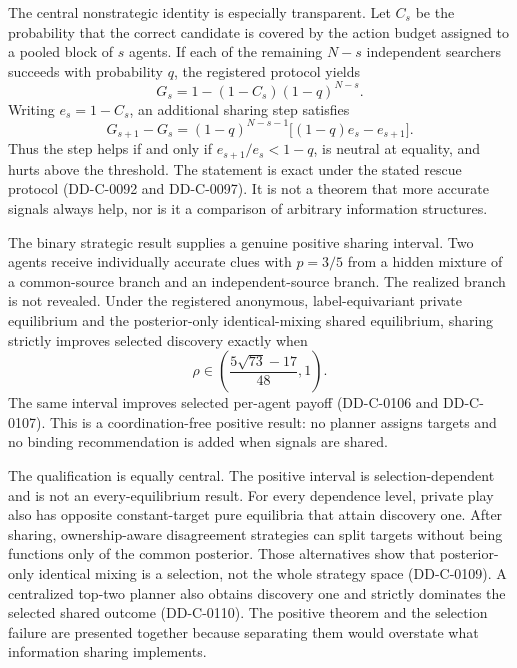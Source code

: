 \documentclass[12pt]{article}
\theoremstyle{definition}
\begin{document}
The central nonstrategic identity is especially transparent. Let $C_s$ be the
probability that the correct candidate is covered by the action budget assigned
to a pooled block of $s$ agents. If each of the remaining $N-s$ independent
searchers succeeds with probability $q$, the registered protocol yields
\begin{equation}
  G_s=1-(1-C_s)(1-q)^{N-s}.
  \label{eq:incremental-value}
\end{equation}
Writing $e_s=1-C_s$, an additional sharing step satisfies
\begin{equation}
 G_{s+1}-G_s=(1-q)^{N-s-1}\big[(1-q)e_s-e_{s+1}\big].
 \label{eq:frontier-intro}
\end{equation}
Thus the step helps if and only if $e_{s+1}/e_s<1-q$, is neutral at equality,
and hurts above the threshold. The statement is exact under the stated rescue
protocol (DD-C-0092 and DD-C-0097). It is not a theorem that more accurate
signals always help, nor is it a comparison of arbitrary information structures.

The binary strategic result supplies a genuine positive sharing interval. Two
agents receive individually accurate clues with $p=3/5$ from a hidden mixture of
a common-source branch and an independent-source branch. The realized branch is
not revealed. Under the registered anonymous, label-equivariant private
equilibrium and the posterior-only identical-mixing shared equilibrium, sharing
strictly improves selected discovery exactly when
\begin{equation}
 \rho\in\left(\frac{5\sqrt{73}-17}{48},1\right).
 \label{eq:positive-interval}
\end{equation}
The same interval improves selected per-agent payoff (DD-C-0106 and
DD-C-0107). This is a coordination-free positive result: no planner assigns
targets and no binding recommendation is added when signals are shared.

The qualification is equally central. The positive interval is
selection-dependent and is not an every-equilibrium result. For every dependence
level, private play also has opposite constant-target pure equilibria that attain
discovery one. After sharing, ownership-aware disagreement strategies can split
targets without being functions only of the common posterior. Those alternatives
show that posterior-only identical mixing is a selection, not the whole strategy
space (DD-C-0109). A centralized top-two planner also obtains discovery one and
strictly dominates the selected shared outcome (DD-C-0110). The positive theorem
and the selection failure are presented together because separating them would
overstate what information sharing implements.
\end{document}
